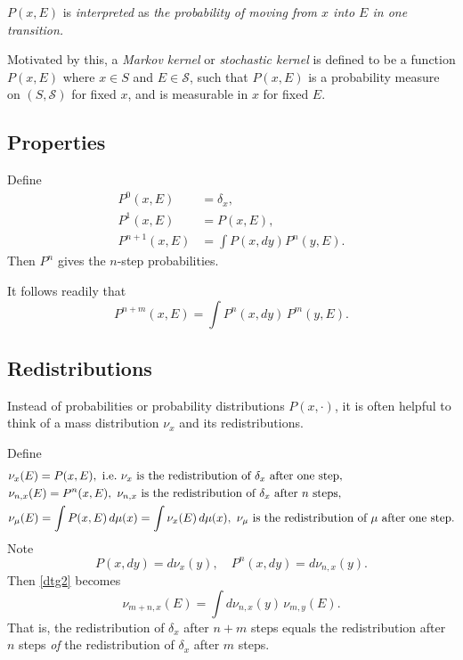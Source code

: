 \documentclass[a4paper]{amsart}
\theoremstyle{plain}
\theoremstyle{definition}
\theoremstyle{remark}
\begin{document}
$ P(x,E) $  is \emph{interpreted} as \emph{the probability of moving from $ x $ into $ E $ in one transition.}

Motivated by this, a \emph{Markov kernel} or \emph{stochastic kernel} is defined to be a function $ P(x,E) $ where $ x\in S $ and $  E\in \mathcal{S} $, such that  $ P(x,E) $ is a probability measure on $   ( S, \mathcal{S} ) $ for fixed $ x $,  and is measurable in $ x $ for fixed $ E $.

\subsection{Properties}
Define
\begin{equation} \label{dtg1}
\begin{aligned}
P^0(x,E) &= \delta _x, \\
P^1(x,E) &= P(x,E), \\
P^{n+1} (x,E) &= \int P(x,dy) P^n(y,E).
\end{aligned}
\end{equation}
Then $ P^n $ gives the $n  $-step probabilities.

It follows readily that
\begin{equation} \label{dtg2}
P^{n+m} (x,E) = \int P^n(x,dy)\, P^m(y,E).
\end{equation} 
 

\subsection{Redistributions}  \label{secred} Instead of  probabilities or probability distributions $ P(x,\cdot) $, it is often helpful to think of a mass distribution $ \nu_x $ and its redistributions.

Define
\begin{equation} \label{rdm} 
\begin{aligned}
&\nu_x(E)  = P(x,E), \text{ i.e.\  $ \nu_x $ is the  redistribution of $ \delta_x $ after one step},\\
&\nu_{n,x}(E)   = P^n(x,E), \text{   $ \nu_{n,x}  $ is the  redistribution of $ \delta_x $ after $ n $  steps},\\
&\nu_\mu(E)   = \int P(x,E)\, d\mu(x)= \int \nu_x(E)\, d\mu(x) , \text{  $ \nu_\mu  $ is the  redistribution of $\mu $ after one  step}. 
\end{aligned} 
\end{equation} 
Note 
\[
P(x,dy) =   d\nu_x(y), \quad P^n(x,dy) =   d\nu_{n,x}(y).
\]
Then  \eqref{dtg2}  becomes
\[  \nu_{m+n,x}(E) = \int d\nu_{n,x}(y)\, \nu_{m,y}(E). \]
That is, the redistribution of $ \delta_x $ after $ n+m $ steps equals the redistribution after $ n $ steps \emph{of} the redistribution of $ \delta_x $  after $ m $ steps.
\end{document}

